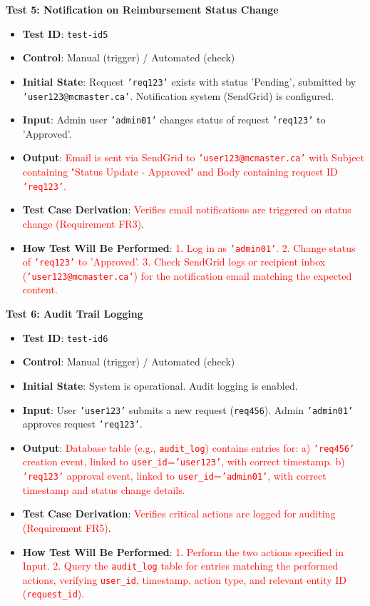 \documentclass[12pt, titlepage]{article}
\begin{document}
\textbf{Test 5: Notification on Reimbursement Status Change} \label{test-id5}
\begin{itemize}
    \item \textbf{Test ID}: \texttt{test-id5}
    \item \textbf{Control}: Manual (trigger) / Automated (check)
    \item \textbf{Initial State}: Request \texttt{'req123'} exists with status 'Pending', submitted by \texttt{'user123@mcmaster.ca'}. Notification system (SendGrid) is configured.
    \item \textbf{Input}: Admin user \texttt{'admin01'} changes status of request \texttt{'req123'} to 'Approved'.
    \item \textbf{Output}: \textcolor{red}{Email is sent via SendGrid to \texttt{'user123@mcmaster.ca'} with Subject containing "Status Update - Approved" and Body containing request ID \texttt{'req123'}.}
    \item \textbf{Test Case Derivation}: \textcolor{red}{Verifies email notifications are triggered on status change (Requirement FR3)}.
    \item \textbf{How Test Will Be Performed}: \textcolor{red}{1. Log in as \texttt{'admin01'}. 2. Change status of \texttt{'req123'} to 'Approved'. 3. Check SendGrid logs or recipient inbox (\texttt{'user123@mcmaster.ca'}) for the notification email matching the expected content.}
\end{itemize}

\textbf{Test 6: Audit Trail Logging} \label{test-id6}
\begin{itemize}
    \item \textbf{Test ID}: \texttt{test-id6}
    \item \textbf{Control}: Manual (trigger) / Automated (check)
    \item \textbf{Initial State}: System is operational. Audit logging is enabled.
    \item \textbf{Input}: User \texttt{'user123'} submits a new request (\texttt{req456}). Admin \texttt{'admin01'} approves request \texttt{'req123'}.
    \item \textbf{Output}: \textcolor{red}{Database table (e.g., \texttt{audit\_log}) contains entries for: a) \texttt{'req456'} creation event, linked to \texttt{user\_id}=\texttt{'user123'}, with correct timestamp. b) \texttt{'req123'} approval event, linked to \texttt{user\_id}=\texttt{'admin01'}, with correct timestamp and status change details.}
    \item \textbf{Test Case Derivation}: \textcolor{red}{Verifies critical actions are logged for auditing (Requirement FR5)}.
    \item \textbf{How Test Will Be Performed}: \textcolor{red}{1. Perform the two actions specified in Input. 2. Query the \texttt{audit\_log} table for entries matching the performed actions, verifying \texttt{user\_id}, timestamp, action type, and relevant entity ID (\texttt{request\_id}).} %
\end{itemize}
\end{document}
